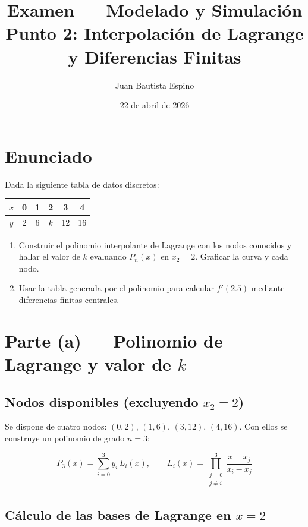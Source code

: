 \documentclass[12pt,a4paper]{article}
\title{\textbf{Examen --- Modelado y Simulaci\'on}\\[0.3em]
       {\large Punto 2: Interpolaci\'on de Lagrange y Diferencias Finitas}}
\author{Juan Bautista Espino}
\date{22 de abril de 2026}
\begin{document}
\maketitle\thispagestyle{fancy}

\section*{Enunciado}

Dada la siguiente tabla de datos discretos:

\begin{center}
\renewcommand{\arraystretch}{1.4}
\begin{tabular}{c|ccccc}
\toprule
$x$ & 0 & 1 & 2 & 3 & 4 \\
\midrule
$y$ & 2 & 6 & $k$ & 12 & 16 \\
\bottomrule
\end{tabular}
\end{center}

\begin{enumerate}
  \item[(a)] Construir el polinomio interpolante de Lagrange con los nodos conocidos y hallar
        el valor de $k$ evaluando $P_n(x)$ en $x_2=2$. Graficar la curva y cada nodo.
  \item[(b)] Usar la tabla generada por el polinomio para calcular $f'(2.5)$ mediante
        diferencias finitas centrales.
\end{enumerate}

\section*{Parte (a) --- Polinomio de Lagrange y valor de $k$}

\subsection*{Nodos disponibles (excluyendo $x_2=2$)}

Se dispone de cuatro nodos: $(0,2)$, $(1,6)$, $(3,12)$, $(4,16)$.
Con ellos se construye un polinomio de grado $n=3$:

\[
  P_3(x) = \sum_{i=0}^{3} y_i\, L_i(x), \qquad
  L_i(x) = \prod_{\substack{j=0\\j\ne i}}^{3} \frac{x - x_j}{x_i - x_j}
\]

\subsection*{C\'alculo de las bases de Lagrange en $x=2$}
\end{document}
